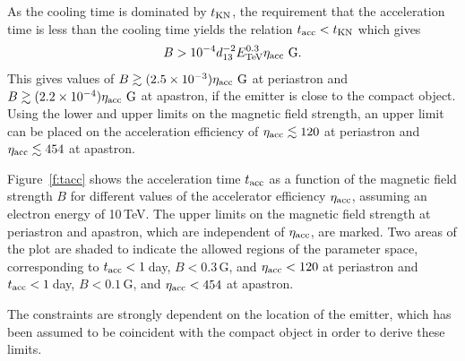 \documentclass[preprint2]{aastex}
\newcommand{\tev}{\,TeV}
\begin{document}
As the cooling time is dominated by $t_{\mbox{\scriptsize{KN}}}$, the requirement that the acceleration time is less than the cooling time yields the relation $t_{\mbox{\scriptsize{acc}}} < t_{\mbox{\scriptsize{KN}}}$ which gives
\begin{equation}
B > 10^{-4} d_{13}^{-2} E_{\mbox{\scriptsize{TeV}}}^{0.3} \eta_{\mbox{\scriptsize{acc}}} \,\mbox{\,G}.
\end{equation}
This gives values of $B \gtrsim (2.5 \times 10^{-3}) \eta_{\mbox{\scriptsize{acc}}} \,\mbox{\,G}$ at periastron and $B \gtrsim (2.2 \times 10^{-4}) \eta_{\mbox{\scriptsize{acc}}} \,\mbox{\,G}$ at apastron, if the emitter is close to the compact object. Using the lower and upper limits on the magnetic field strength, an upper limit can be placed on the acceleration efficiency of $\eta_{\mbox{\scriptsize{acc}}} \lesssim 120$ at periastron and $\eta_{\mbox{\scriptsize{acc}}} \lesssim 454$ at apastron.

Figure~\ref{f:tacc} shows the acceleration time $t_{\mbox{\scriptsize{acc}}}$ as a function of the magnetic field strength $B$ for different values of the accelerator efficiency $\eta_{\mbox{\scriptsize{acc}}}$, assuming an electron energy of 10\tev{}. The upper limits on the magnetic field strength at periastron and apastron, which are independent of $\eta_{\mbox{\scriptsize{acc}}}$, are marked. Two areas of the plot are shaded to indicate the allowed regions of the parameter space, corresponding to $t_{\mbox{\scriptsize{acc}}} < 1$\,day, $B < 0.3$\,G, and $\eta_{\mbox{\scriptsize{acc}}} < 120$ at periastron and $t_{\mbox{\scriptsize{acc}}} < 1$\,day, $B < 0.1$\,G, and $\eta_{\mbox{\scriptsize{acc}}} < 454$ at apastron.

The constraints are strongly dependent on the location of the emitter, which has been assumed to be coincident with the compact object in order to derive these limits.%
\end{document}
